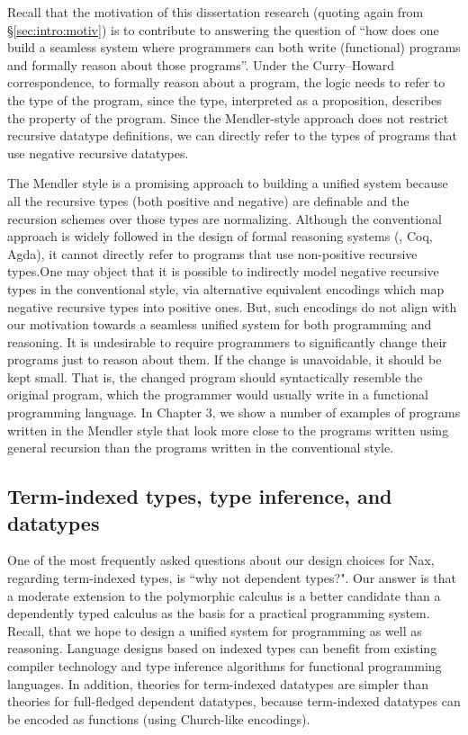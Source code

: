 Recall that the motivation of this dissertation research
(quoting again from \S\ref{sec:intro:motiv})
is to contribute to answering the question of ``how does one build a
seamless system where programmers can both write (functional) programs and
formally reason about those programs''. Under the Curry--Howard correspondence,
to formally reason about a program, the logic needs to refer to the type of
the program, since the type, interpreted as a proposition, describes
the property of the program. Since the Mendler-style approach does not
restrict recursive datatype definitions, we can directly refer to the types
of programs that use negative recursive datatypes.

The Mendler style is a promising approach to building a unified system because
all the recursive types (both positive and negative) are definable and
the recursion schemes over those types are normalizing.
Although the conventional approach is widely followed
in the design of formal reasoning systems (\eg, Coq, Agda), it cannot directly
refer to programs that use non-positive recursive types.One may object that
it is possible to indirectly model negative recursive types
in the conventional style, via alternative equivalent encodings
which map negative recursive types into positive ones. But, such
encodings do not align with our motivation towards a seamless unified
system for both programming and reasoning. It is undesirable to require
programmers to significantly change their programs just to reason about them.
If the change is unavoidable, it should be kept small. That is,
the changed program should syntactically resemble the original program,
which the programmer would usually write in a functional programming language.
In Chapter 3, we show a number of examples of programs written in
the Mendler style that look more close to the programs written using
general recursion than the programs written in the conventional style.

\subsection{Term-indexed types, type inference, and datatypes}
\label{sec:intro:concepts:indexed}
One of the most frequently asked questions about our design choices for Nax,
regarding term-indexed types, is ``why not dependent types?". Our answer
is that a moderate extension to the polymorphic calculus is a better candidate
than a dependently typed calculus as the basis for a practical programming
system. Recall, that we hope to design a unified system for programming
as well as reasoning. Language designs based on indexed types can
benefit from existing compiler technology and type inference algorithms
for functional programming languages. In addition, theories for
term-indexed datatypes are simpler than theories for full-fledged
dependent datatypes, because term-indexed datatypes can be encoded as
functions (using Church-like encodings).


